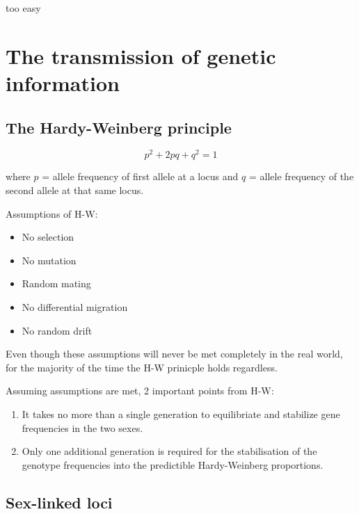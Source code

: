 \documentclass[
]{book}
\providecommand{\tightlist}{%
  \setlength{\itemsep}{0pt}\setlength{\parskip}{0pt}}
\begin{document}
too easy

\hypertarget{the-transmission-of-genetic-information}{%
\section{The transmission of genetic information}\label{the-transmission-of-genetic-information}}

\hypertarget{the-hardy-weinberg-principle}{%
\subsection{The Hardy-Weinberg principle}\label{the-hardy-weinberg-principle}}

\begin{equation}
  p^2 + 2pq + q^2 = 1
  \label{eq:hardy-weinberg-principal}
\end{equation}

where \(p\) = allele frequency of first allele at a locus and \(q\) = allele frequency of the second allele at that same locus.

Assumptions of H-W:

\begin{itemize}
\tightlist
\item
  No selection
\item
  No mutation
\item
  Random mating
\item
  No differential migration
\item
  No random drift
\end{itemize}

Even though these assumptions will never be met completely in the real world, for the majority of the time the H-W prinicple holds regardless.

Assuming assumptions are met, 2 important points from H-W:

\begin{enumerate}
\def\labelenumi{\arabic{enumi}.}
\tightlist
\item
  It takes no more than a single generation to equilibriate and stabilize gene frequencies in the two sexes.
\item
  Only one additional generation is required for the stabilisation of the genotype frequencies into the predictible Hardy-Weinberg proportions.
\end{enumerate}

\hypertarget{sex-linked-loci}{%
\subsection{Sex-linked loci}\label{sex-linked-loci}}
\end{document}

